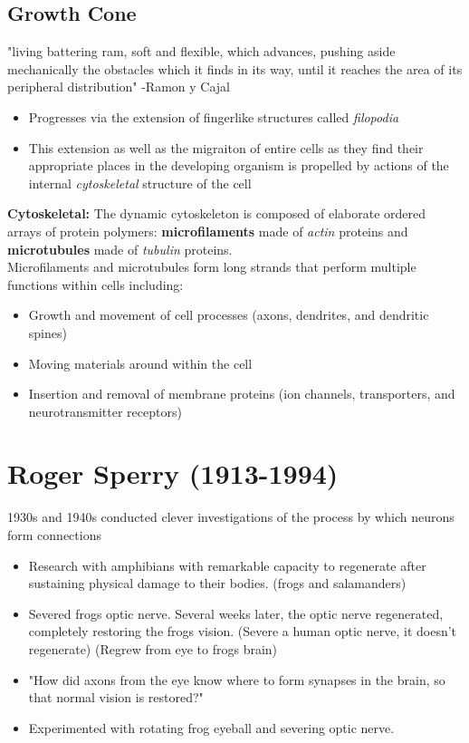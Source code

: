 \documentclass{article}
\begin{document}
\subsection{Growth Cone}
"living battering ram, soft and flexible, which advances, pushing aside mechanically the obstacles which it finds in its way, until it reaches the area of its peripheral distribution" -Ramon y Cajal 
\begin{itemize}
    \item Progresses via the extension of fingerlike structures called \textit{filopodia}
    \item This extension as well as the migraiton of entire cells as they find their appropriate places in the developing organism is propelled by actions of the internal \textit{cytoskeletal} structure of the cell
\end{itemize}
\textbf{Cytoskeletal:} The dynamic cytoskeleton is composed of elaborate ordered arrays of protein polymers: 
\textbf{microfilaments} made of \textit{actin} proteins and \textbf{microtubules} made of \textit{tubulin} proteins. \\
Microfilaments and microtubules form long strands that perform multiple functions within cells including: 
\begin{itemize}
    \item Growth and movement of cell processes (axons, dendrites, and dendritic spines) 
    \item Moving materials around within the cell
    \item Insertion and removal of membrane proteins (ion channels, transporters, and neurotransmitter receptors)
\end{itemize}

\section{Roger Sperry (1913-1994)}
1930s and 1940s conducted clever investigations of the process by which neurons form connections
\begin{itemize}
    \item Research with amphibians with remarkable capacity to regenerate after sustaining physical damage to their bodies. (frogs and salamanders)
    \item Severed frogs optic nerve. Several weeks later, the optic nerve regenerated, completely restoring the frogs vision. (Severe a human optic nerve, it doesn't regenerate) (Regrew from eye to frogs brain)
    \item "How did axons from the eye know where to form synapses in the brain, so that normal vision is restored?"
    \item Experimented with rotating frog eyeball and severing optic nerve. 
\end{itemize}
\end{document}
